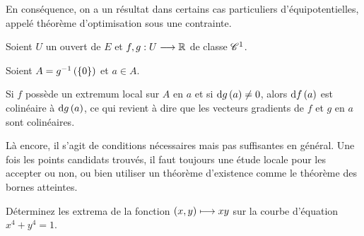 En conséquence, on a un résultat dans certains cas particuliers d'équipotentielles, appelé théorème d'optimisation sous une contrainte.

\begin{prop}
Soient \(U\) un ouvert de \(E\) et \(f,g:U\longrightarrow\mathbb{R}\) de classe \(\mathscr{C}^{1}\).

Soient \(A=g^{-1}\left(\left\lbrace0\right\rbrace\right)\) et \(a\in A\).

Si \(f\) possède un extremum local sur \(A\) en \(a\) et si \(\odif{g}\paren{a}\not=0\), alors \(\odif{f}\paren{a}\) est colinéaire à \(\odif{g}\paren{a}\), ce qui revient à dire que les vecteurs gradients de \(f\) et \(g\) en \(a\) sont colinéaires.
\end{prop}

\begin{rem}
Là encore, il s'agit de conditions nécessaires mais pas suffisantes en général. Une fois les points candidats trouvés, il faut toujours une étude locale pour les accepter ou non, ou bien utiliser un théorème d'existence comme le théorème des bornes atteintes.
\end{rem}

\begin{exo}
Déterminez les extrema de la fonction \(\left(x,y\right)\longmapsto xy\) sur la courbe d'équation \(x^4+y^4=1\).
\end{exo}

